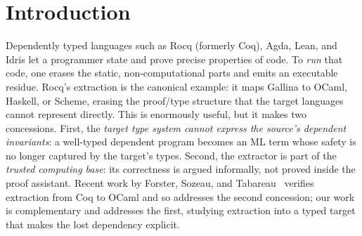 \documentclass[acmsmall,anonymous=false,nonacm]{acmart}
\begin{document}

\maketitle

\section{Introduction}

Dependently typed languages such as Rocq (formerly Coq), Agda, Lean, and Idris
let a programmer state and prove precise properties of code. To \emph{run} that
code, one erases the static, non-computational parts and emits an executable
residue. Rocq's extraction \cite{letouzey2003extraction,letouzey2004these} is
the canonical example: it maps Gallina to OCaml, Haskell, or Scheme, erasing the
proof/type structure that the target languages cannot represent directly. This is enormously useful, but it makes two concessions.
First, the \emph{target type system cannot express the source's dependent
invariants}: a well-typed dependent program becomes an ML term whose safety is
no longer captured by the target's types. Second, the extractor is part of the
\emph{trusted computing base}: its correctness is argued informally, not proved
inside the proof assistant. Recent work by Forster, Sozeau, and
Tabareau~\cite{forster2024verified} verifies extraction from Coq to OCaml and
so addresses the second concession; our work is complementary and addresses
the first, studying extraction into a typed target that makes the lost
dependency explicit.
\end{document}
